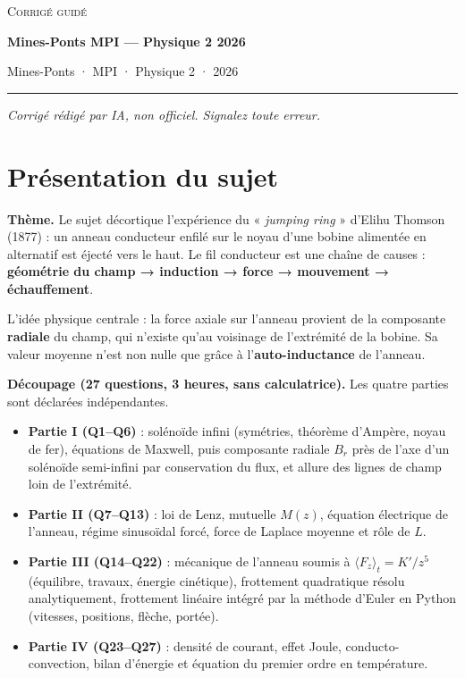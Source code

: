 \documentclass[11pt,a4paper]{article}
\providecommand{\tightlist}{\setlength{\itemsep}{0pt}\setlength{\parskip}{0pt}}
\begin{document}
\thispagestyle{plain}
\begin{center}
  {\small\scshape Corrigé guidé}\par\smallskip
  {\LARGE\bfseries Mines-Ponts MPI — Physique 2 2026\par}\medskip
  {\large Mines-Ponts · MPI · Physique 2 · 2026\par}
\end{center}
\vspace{2pt}\hrule\vspace{8pt}

\emph{Corrigé rédigé par IA, non officiel. Signalez toute erreur.}

\hypertarget{pruxe9sentation-du-sujet}{%
\section{Présentation du sujet}\label{pruxe9sentation-du-sujet}}

\textbf{Thème.} Le sujet décortique l'expérience du « \emph{jumping ring} » d'Elihu Thomson (1877) : un anneau conducteur enfilé sur le noyau d'une bobine alimentée en alternatif est éjecté vers le haut. Le fil conducteur est une chaîne de causes : \textbf{géométrie du champ → induction → force → mouvement → échauffement}.

L'idée physique centrale : la force axiale sur l'anneau provient de la composante \textbf{radiale} du champ, qui n'existe qu'au voisinage de l'extrémité de la bobine. Sa valeur moyenne n'est non nulle que grâce à l'\textbf{auto-inductance} de l'anneau.

\textbf{Découpage (27 questions, 3 heures, sans calculatrice).} Les quatre parties sont déclarées indépendantes.

\begin{itemize}
\tightlist
\item
  \textbf{Partie I (Q1--Q6)} : solénoïde infini (symétries, théorème d'Ampère, noyau de fer), équations de Maxwell, puis composante radiale \(B_r\) près de l'axe d'un solénoïde semi-infini par conservation du flux, et allure des lignes de champ loin de l'extrémité.
\item
  \textbf{Partie II (Q7--Q13)} : loi de Lenz, mutuelle \(M(z)\), équation électrique de l'anneau, régime sinusoïdal forcé, force de Laplace moyenne et rôle de \(L\).
\item
  \textbf{Partie III (Q14--Q22)} : mécanique de l'anneau soumis à \(\langle F_z\rangle_t=K'/z^5\) (équilibre, travaux, énergie cinétique), frottement quadratique résolu analytiquement, frottement linéaire intégré par la méthode d'Euler en Python (vitesses, positions, flèche, portée).
\item
  \textbf{Partie IV (Q23--Q27)} : densité de courant, effet Joule, conducto-convection, bilan d'énergie et équation du premier ordre en température.
\end{itemize}
\end{document}
